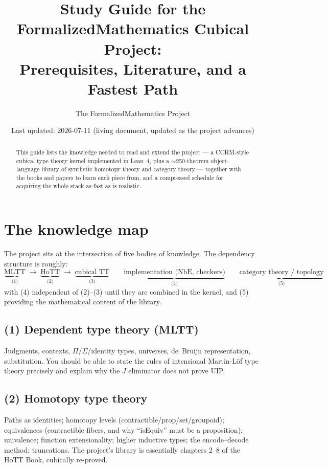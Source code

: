 \documentclass[11pt]{article}
\title{Study Guide for the FormalizedMathematics Cubical Project:\\
Prerequisites, Literature, and a Fastest Path}
\author{The FormalizedMathematics Project}
\date{Last updated: 2026-07-11 (living document, updated as the project advances)}
\begin{document}
\maketitle

\begin{abstract}
This guide lists the knowledge needed to read and extend the project ---
a CCHM-style cubical type theory kernel implemented in Lean~4, plus a
$\sim$250-theorem object-language library of synthetic homotopy theory
and category theory --- together with the books and papers to learn each
piece from, and a compressed schedule for acquiring the whole stack as
fast as is realistic.
\end{abstract}

\tableofcontents

\section{The knowledge map}

The project sits at the intersection of five bodies of knowledge.  The
dependency structure is roughly:
\[
\underbrace{\text{MLTT}}_{\text{(1)}}
\;\longrightarrow\;
\underbrace{\text{HoTT}}_{\text{(2)}}
\;\longrightarrow\;
\underbrace{\text{cubical TT}}_{\text{(3)}}
\qquad
\underbrace{\text{implementation (NbE, checkers)}}_{\text{(4)}}
\qquad
\underbrace{\text{category theory / topology}}_{\text{(5)}}
\]
with (4) independent of (2)--(3) until they are combined in the kernel,
and (5) providing the mathematical content of the library.

\subsection*{(1) Dependent type theory (MLTT)}
Judgments, contexts, $\Pi$/$\Sigma$/identity types, universes, de~Bruijn
representation, substitution.  You should be able to state the rules of
intensional Martin-L\"of type theory precisely and explain why the
$J$ eliminator does not prove UIP.

\subsection*{(2) Homotopy type theory}
Paths as identities; homotopy levels (contractible/prop/set/groupoid);
equivalences (contractible fibers, and why ``isEquiv'' must be a
proposition); univalence; function extensionality; higher inductive
types; the encode--decode method; truncations.  The project's library is
essentially chapters 2--8 of the HoTT Book, cubically re-proved.
\end{document}
